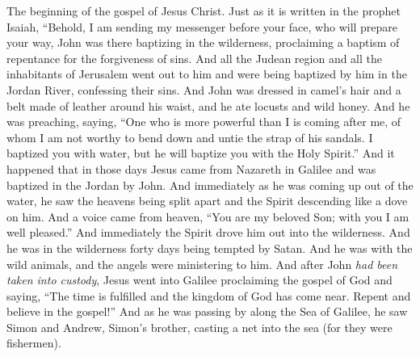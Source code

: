 
\begin{biblechapter} %
 The beginning of the gospel of Jesus Christ.
\verse Just as it is written in the prophet Isaiah,
\verse “Behold, I am sending my messenger before your face, 
who will prepare your way,
\verse John was there baptizing in the wilderness, proclaiming a baptism of repentance for the forgiveness of sins.
\verse And all the Judean region and all the inhabitants of Jerusalem went out to him and were being baptized by him in the Jordan River, confessing their sins.
\verse And John was dressed in camel’s hair and a belt made of leather around his waist, and he ate locusts and wild honey.
\verse And he was preaching, saying, “One who is more powerful than I is coming after me, of whom I am not worthy to bend down and untie the strap of his sandals.
\verse I baptized you with water, but he will baptize you with the Holy Spirit.”
 And it happened that in those days Jesus came from Nazareth in Galilee and was baptized in the Jordan by John.
\verse And immediately as he was coming up out of the water, he saw the heavens being split apart and the Spirit descending like a dove on him.
\verse And a voice came from heaven, “You are my beloved Son; with you I am well pleased.”
 And immediately the Spirit drove him out into the wilderness.
\verse And he was in the wilderness forty days being tempted by Satan. And he was with the wild animals, and the angels were ministering to him.
 And after John \textit{had been taken into custody}, Jesus went into Galilee proclaiming the gospel of God
\verse and saying, “The time is fulfilled and the kingdom of God has come near. Repent and believe in the gospel!”
 And as he was passing by along the Sea of Galilee, he saw Simon and Andrew, Simon’s brother, casting a net into the sea (for they were fishermen).

\end{biblechapter}
